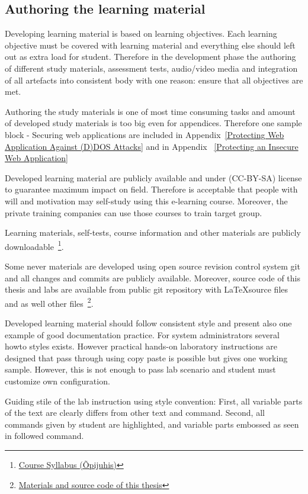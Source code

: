 \subsection{Authoring the learning material}
Developing learning material is based on learning objectives. Each learning objective must be covered with learning material and everything else should left out as extra load for student. Therefore in the development phase the authoring of different study materials, assessment tests, audio/video media and integration of all artefacts into consistent body with one reason: ensure that all objectives are met.

Authoring the study materials is one of most time consuming tasks and amount of developed study materials is too big even for appendices. Therefore one sample block - Securing web applications are included in Appendix~\ref{Protecting Web Application Against (D)DOS Attacks} and in Appendix~ \ref{Protecting an Insecure Web Application} 

Developed learning material are publicly available and under (\gls{CC-BY-SA}) license to guarantee maximum impact on field. Therefore is acceptable that people with will and motivation may self-study using this e-learning course. Moreover, the private training companies can use those courses to train target group.

Learning materials, self-tests, course information and other materials are publicly downloadable~\footnote{\href{http://elab.itcollege.ee:8000/cyber-course/}{Course Syllabus (Õpijuhis)}}.


Some never materials are developed using open source revision control system \gls{git} and all changes and commits are publicly available. Moreover, source code of this thesis and labs are available from public \gls{git} repository with \LaTeX  source files and as well other files~\footnote{\href{https://github.com/magavdraakon/margus-thesis.git}{Materials and source code of this thesis}}.


Developed learning material should follow consistent style and present also one example of good documentation practice. For system administrators several howto styles exists. However practical hands-on laboratory instructions are designed that pass through using copy paste is possible but gives one working sample. However, this is not enough to pass lab scenario and student must customize own configuration.

Guiding stile of the lab instruction using style convention: First, all variable parts of the text are clearly differs from other text and command. Second, all commands given by student are highlighted, and variable parts embossed as seen in followed command.


